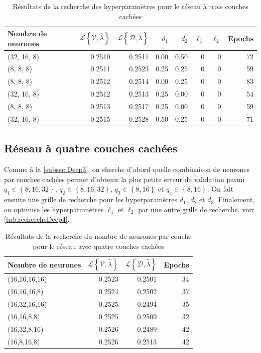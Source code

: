 \begin{table}
\centering
\caption{\label{tab:ResultsDeep3Tuning}Résultats de la recherche des hyperparamètres pour le réseau à trois couches cachées}
\begin{tabularx}{0.8\textwidth}{Xrrrrrrr}
\toprule
Nombre \newline de neurones & $\mathcal{L}\left\{\mathcal{V},\hat{\lambda} \right\} $ & $\mathcal{L}\left\{\mathcal{D},\hat{\lambda} \right\} $ & $d_1$ & $d_2$ & $\ell_1$ & $\ell_2$ & Epochs\\
\midrule
(32, 16, 8) & 0.2510 & 0.2511 & 0.00 & 0.50 & 0 & 0 & 72\\
(8, 8, 8) & 0.2511 & 0.2523 & 0.25 & 0.25 & 0 & 0 & 59\\
(8, 8, 8) & 0.2512 & 0.2514 & 0.00 & 0.25 & 0 & 0 & 83\\
(32, 16, 8) & 0.2512 & 0.2513 & 0.25 & 0.00 & 0 & 0 & 54\\
(8, 8, 8) & 0.2513 & 0.2517 & 0.25 & 0.00 & 0 & 0 & 59\\
\addlinespace
(32, 16, 8) & 0.2515 & 0.2528 & 0.50 & 0.25 & 0 & 0 & 71\\
\bottomrule
\end{tabularx}
\end{table}

\subsection{Réseau à quatre couches cachées}
\label{subsec:deep4}

Comme à la \autoref{subsec:Deep3}, on cherche d'abord quelle combinaison de neurones par couches cachées permet d'obtenir la plus petite erreur de validation parmi $q_1 \in \left\{8, 16, 32 \right\}$, $q_2 \in \left\{8, 16, 32 \right\}$, $q_3 \in \left\{8, 16\right\}$ et $q_4 \in \left\{8, 16 \right\}$. On fait ensuite une grille de recherche pour les hyperparamètres $d_1$, $d_2$ et $d_3$. Finalement, on optimise les hyperparamètres $\ell_1$ et $\ell_2$ par une autre grille de recherche, voir \autoref{tab:rechercheDeep4}. 

\begin{table}
\centering
\caption{\label{tab:ResultsDeep4} Résultats de la recherche du nombre de neurones par couche pour le réseau avec quatre couches cachées}
\begin{tabularx}{0.6\textwidth}{Xrrr}
\toprule
Nombre \newline de neurones & $\mathcal{L}\left\{\mathcal{V},\hat{\lambda} \right\} $ & $\mathcal{L}\left\{\mathcal{D},\hat{\lambda} \right\} $ & Epochs\\
\midrule
(16,16,16,16) & 0.2523 & 0.2501 & 34\\
(16,16,16,8) & 0.2524 & 0.2502 & 37\\
(16,32,16,16) & 0.2525 & 0.2494 & 35\\
(16,16,8,8) & 0.2525 & 0.2509 & 32\\
(16,32,8,16) & 0.2526 & 0.2489 & 42\\
\addlinespace
(16,8,16,8) & 0.2526 & 0.2513 & 42\\
\bottomrule
\end{tabularx}
\end{table}

